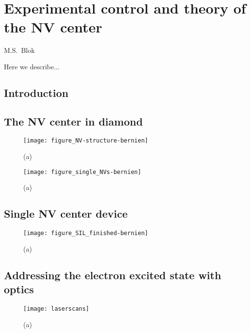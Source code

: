 \graphicspath{{./ch_theory_and_methods/figures/}}


\chapter{Experimental control and theory of the NV center}
\label{ch:CDL}

\begin{center} 
    \vspace{-1cm} {M.S.~Blok} 
\end{center}




\vspace{-0.5cm} 
Here we describe...
\clearpage

\section{Introduction}

\section{The NV center in diamond}
\begin{figure*}
	\centering
	\texttt{[image: figure\_NV-structure-bernien]}
	\caption{\label{fig:tam-fig1-nvstruct} \textbf{} (a) }
\end{figure*}

\begin{figure*}
	\centering
	\texttt{[image: figure\_single\_NVs-bernien]}
	\caption{\label{fig:tam-fig2-nvstruct} \textbf{} (a) }
\end{figure*}


\section{Single NV center device}
\begin{figure*}
	\centering
	\texttt{[image: figure\_SIL\_finished-bernien]}
	\caption{\label{fig:tam-fig3-device} \textbf{} (a) }
\end{figure*}

\section{Addressing the electron excited state with optics}
\begin{figure*}
	\centering
	\texttt{[image: laserscans]}
	\caption{\label{fig:tam-fig4-laserscan} \textbf{} (a) }
\end{figure*}

